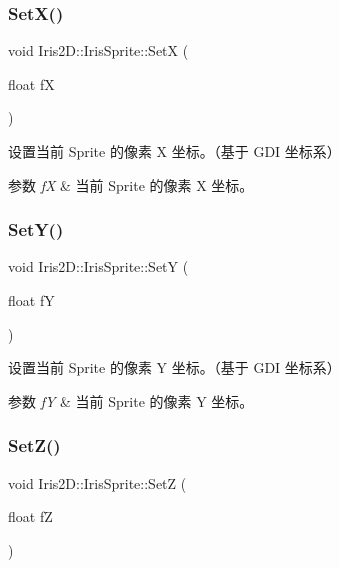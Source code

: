 \subsubsection{\texorpdfstring{Set\+X()}{SetX()}}
{\footnotesize\ttfamily void Iris2\+D\+::\+Iris\+Sprite\+::\+SetX (\begin{DoxyParamCaption}\item[{float}]{fX }\end{DoxyParamCaption})}



设置当前 Sprite 的像素 X 坐标。（基于 G\+DI 坐标系） 


\begin{DoxyParams}{参数}
{\em fX} & 当前 Sprite 的像素 X 坐标。 \\
\hline
\end{DoxyParams}
\mbox{\label{class_iris2_d_1_1_iris_sprite_a8064039bfeb3a364a8abeae7265cd429}} 
\subsubsection{\texorpdfstring{Set\+Y()}{SetY()}}
{\footnotesize\ttfamily void Iris2\+D\+::\+Iris\+Sprite\+::\+SetY (\begin{DoxyParamCaption}\item[{float}]{fY }\end{DoxyParamCaption})}



设置当前 Sprite 的像素 Y 坐标。（基于 G\+DI 坐标系） 


\begin{DoxyParams}{参数}
{\em fY} & 当前 Sprite 的像素 Y 坐标。 \\
\hline
\end{DoxyParams}
\mbox{\label{class_iris2_d_1_1_iris_sprite_a284d2af8d27d8fb72718e9554e0e90d9}} 
\subsubsection{\texorpdfstring{Set\+Z()}{SetZ()}}
{\footnotesize\ttfamily void Iris2\+D\+::\+Iris\+Sprite\+::\+SetZ (\begin{DoxyParamCaption}\item[{float}]{fZ }\end{DoxyParamCaption})}



